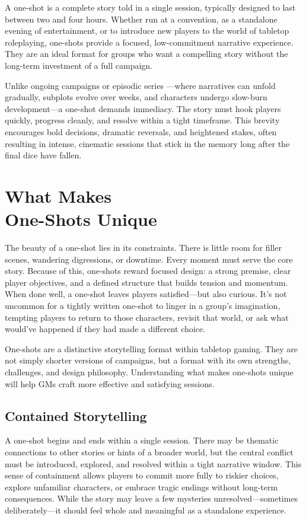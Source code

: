 

A one-shot is a complete story told in a single session, typically designed to last between two and four hours. Whether run at a convention, as a standalone evening of entertainment, or to introduce new players to the world of tabletop roleplaying, one-shots provide a focused, low-commitment narrative experience. They are an ideal format for groups who want a compelling story without the long-term investment of a full campaign.

Unlike ongoing campaigns or episodic series —where narratives can unfold gradually, subplots evolve over weeks, and characters undergo slow-burn development—a one-shot demands immediacy. The story must hook players quickly, progress cleanly, and resolve within a tight timeframe. This brevity encourages bold decisions, dramatic reversals, and heightened stakes, often resulting in intense, cinematic sessions that stick in the memory long after the final dice have fallen.


\section[What Makes One-Shots Unique]{What Makes\\ One-Shots Unique}

The beauty of a one-shot lies in its constraints. There is little room for filler scenes, wandering digressions, or downtime. Every moment must serve the core story. Because of this, one-shots reward focused design: a strong premise, clear player objectives, and a defined structure that builds tension and momentum. When done well, a one-shot leaves players satisfied—but also curious. It’s not uncommon for a tightly written one-shot to linger in a group’s imagination, tempting players to return to those characters, revisit that world, or ask what would’ve happened if they had made a different choice.

One-shots are a distinctive storytelling format within tabletop gaming. They are not simply shorter versions of campaigns, but a format with its own strengths, challenges, and design philosophy. Understanding what makes one-shots unique will help GMs craft more effective and satisfying sessions.

\subsection*{Contained Storytelling}

A one-shot begins and ends within a single session. There may be thematic connections to other stories or hints of a broader world, but the central conflict must be introduced, explored, and resolved within a tight narrative window. This sense of containment allows players to commit more fully to riskier choices, explore unfamiliar characters, or embrace tragic endings without long-term consequences. While the story may leave a few mysteries unresolved—sometimes deliberately—it should feel whole and meaningful as a standalone experience.

